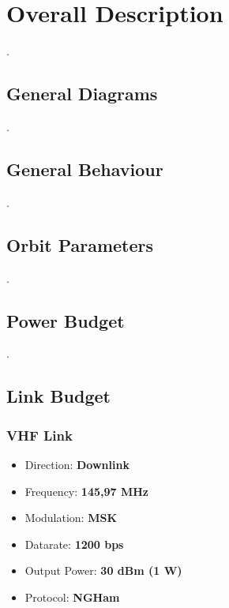 %
%
%
%
%

%
%
%
%
%
%

\chapter{Overall Description} \label{ch:overall}

.

\section{General Diagrams}

.

\section{General Behaviour}

.

\section{Orbit Parameters}

.

\section{Power Budget}

.

\section{Link Budget}

\subsection{VHF Link}

\begin{itemize}
    \item Direction: \textbf{Downlink}
    \item Frequency: \textbf{145,97 MHz}
    \item Modulation: \textbf{MSK}
    \item Datarate: \textbf{1200 bps}
    \item Output Power: \textbf{30 dBm (1 W)}
    \item Protocol: \textbf{NGHam}
\end{itemize}

